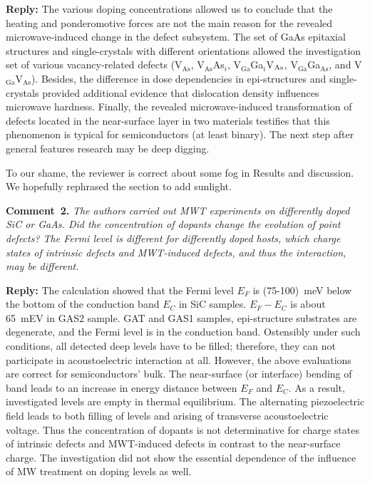 \documentclass[10pt]{iopart}
\begin{document}
\noindent
\textcolor[rgb]{0.51,0.00,0.00}{\textbf{Reply:}}
The various doping concentrations allowed us to conclude
that the heating and ponderomotive forces are not the main reason
for the revealed microwave-induced change in the defect subsystem.
The set of GaAs epitaxial structures and single-crystals with different orientations
allowed the investigation set of various vacancy-related defects
(V$_\mathrm{As}$, V$_\mathrm{As}$As$_i$, V$_\mathrm{Ga}$Ga$_i$V$_{\rm As}$,
V$_\mathrm{Ga}$Ga$_\mathrm{As}$, and V$_\mathrm{Ga}$V$_\mathrm{As}$).
Besides, the difference in dose dependencies in epi-structures and single-crystals
provided additional evidence that dislocation density influences microwave hardness.
Finally, the revealed microwave-induced transformation of
defects located in the near-surface layer in two materials
testifies that this phenomenon is typical for semiconductors (at least binary).
The next step after general features research may be deep digging.

To our shame, the reviewer is correct about some fog in Results and discussion.
We hopefully rephrased the section to add sunlight.



\vspace{1cm}
\noindent
\textcolor[rgb]{0.00,0.50,1.00}{\textbf{Comment~2.}}
\emph{The authors carried out MWT experiments on differently doped SiC or GaAs.
Did the concentration of dopants change the evolution of point defects?
The Fermi level is different for differently doped hosts,
which charge states of intrinsic defects and MWT-induced defects, and thus the interaction, may be different.}

\noindent
\textcolor[rgb]{0.51,0.00,0.00}{\textbf{Reply:}}
The calculation showed that the Fermi level $E_F$ is (75-100)~meV below
the bottom of the conduction band $E_C$ in SiC samples.
$E_F-E_C$ is about 65~mEV in GAS2 sample.
GAT and GAS1 samples, epi-structure substrates are degenerate, and
the Fermi level is in the conduction band.
Ostensibly under such conditions,
all detected deep levels have to be filled;
therefore, they can not participate in acoustoelectric interaction at all.
However, the above evaluations are correct for semiconductors' bulk.
The near-surface (or interface) bending of band leads to an increase in energy distance between
$E_F$ and $E_C$.
As a result, investigated levels  are empty in thermal equilibrium.
The alternating piezoelectric field leads to both filling of levels
and arising of transverse acoustoelectric voltage.
Thus the concentration of dopants is not determinative
for charge states of intrinsic defects and MWT-induced defects
in contrast to the near-surface charge.
The investigation did not show
the essential dependence of the influence of MW treatment on doping levels as well.
\end{document}
